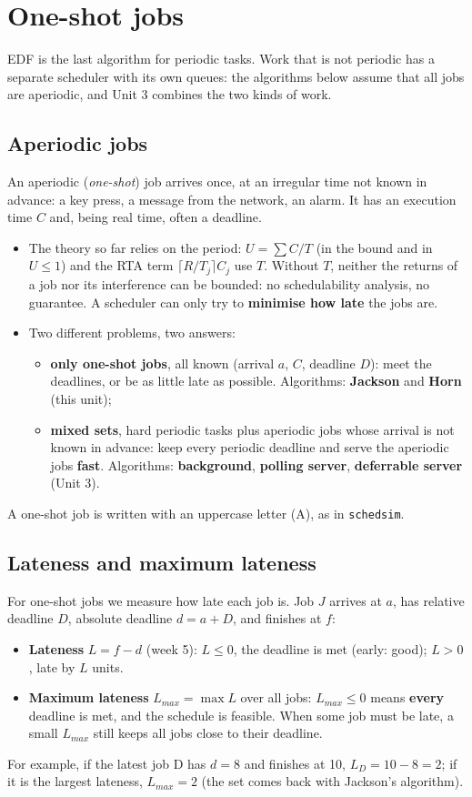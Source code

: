\section{One-shot jobs}
EDF is the last algorithm for periodic tasks. Work that is not periodic has a separate scheduler with its own queues: the algorithms below assume that all jobs are aperiodic, and Unit 3 combines the two kinds of work.

\subsection{Aperiodic jobs}
An aperiodic (\emph{one-shot}) job arrives once, at an irregular time not known in advance: a key press, a message from the network, an alarm. It has an execution time $C$ and, being real time, often a deadline.
\begin{itemize}
    \item The theory so far relies on the period: $U = \sum C/T$ (in the bound and in $U \le 1$) and the RTA term $\lceil R / T_j \rceil C_j$ use $T$. Without $T$, neither the returns of a job nor its interference can be bounded: no schedulability analysis, no guarantee. A scheduler can only try to \textbf{minimise how late} the jobs are.
    \item Two different problems, two answers:
    \begin{itemize}
        \item \textbf{only one-shot jobs}, all known (arrival $a$, $C$, deadline $D$): meet the deadlines, or be as little late as possible. Algorithms: \textbf{Jackson} and \textbf{Horn} (this unit);
        \item \textbf{mixed sets}, hard periodic tasks plus aperiodic jobs whose arrival is not known in advance: keep every periodic deadline and serve the aperiodic jobs \textbf{fast}. Algorithms: \textbf{background}, \textbf{polling server}, \textbf{deferrable server} (Unit 3).
    \end{itemize}
\end{itemize}
A one-shot job is written with an uppercase letter (A), as in \texttt{schedsim}.

\subsection{Lateness and maximum lateness}
For one-shot jobs we measure how late each job is. Job $J$ arrives at $a$, has relative deadline $D$, absolute deadline $d = a + D$, and finishes at $f$:
\begin{itemize}
    \item \textbf{Lateness} $L = f - d$ (week 5): $L \le 0$, the deadline is met (early: good); $L > 0$, late by $L$ units.
    \item \textbf{Maximum lateness} $L_{max} = \max L$ over all jobs: $L_{max} \le 0$ means \textbf{every} deadline is met, and the schedule is feasible. When some job must be late, a small $L_{max}$ still keeps all jobs close to their deadline.
\end{itemize}
For example, if the latest job D has $d = 8$ and finishes at 10, $L_D = 10 - 8 = 2$; if it is the largest lateness, $L_{max} = 2$ (the set comes back with Jackson's algorithm).


